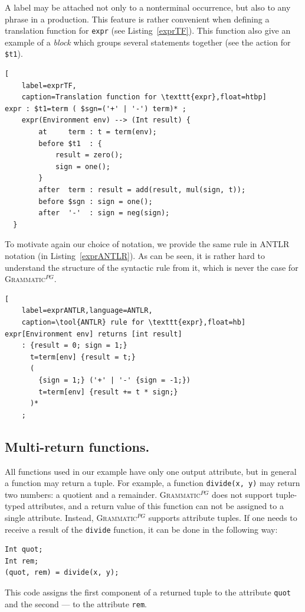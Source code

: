 \documentclass{informat} %
\newcommand{\lstref}[1]{Listing~\ref{#1}}
\newcommand{\tool}[1]{\textsc{#1}}
\newcommand{\ATF}{\textsc{Grammatic}$^{PG}$}
\begin{document}
A label may be attached not only to a nonterminal occurrence, but also to any phrase in a production. This feature is rather convenient when defining a translation function for \texttt{expr} (see \lstref{exprTF}). This function also give an example of a \emph{block} which groups several statements together (see the action for \texttt{\$t1}).

\begin{lstlisting}[
	label=exprTF,
	caption=Translation function for \texttt{expr},float=htbp]
expr : $t1=term ( $sgn=('+' | '-') term)* ;         
	expr(Environment env) --> (Int result) {  
  		at     term : t = term(env);
		before $t1  : {
			result = zero();
			sign = one();
		}
		after  term : result = add(result, mul(sign, t));
		before $sgn : sign = one();
		after  '-'  : sign = neg(sign);
  }
\end{lstlisting}

To motivate again our choice of notation, we provide the same rule in \tool{ANTLR} notation (in \lstref{exprANTLR}). As can be seen, it is rather hard to understand the structure of the syntactic rule from it, which is never the case for \ATF{}.
\begin{lstlisting}[
	label=exprANTLR,language=ANTLR,
	caption=\tool{ANTLR} rule for \texttt{expr},float=hb]
expr[Environment env] returns [int result] 
	: {result = 0; sign = 1;} 
	  t=term[env] {result = t;}
	  (
 	    {sign = 1;} ('+' | '-' {sign = -1;}) 
	    t=term[env] {result += t * sign;}
	  )* 
	;         
\end{lstlisting}

\subsection{Multi-return functions.}
All functions used in our example have only one output attribute, but in general a function may return a tuple. For example, a function \texttt{divide(x,~y)} may return two numbers: a quotient and a remainder. \ATF{} does not support tuple-typed attributes, and a return value of this function can not be assigned to a single attribute. Instead, \ATF{} supports attribute tuples. If one needs to receive a result of the \texttt{divide} function, it can be done in the following way:
\begin{lstlisting}
Int quot;
Int rem;
(quot, rem) = divide(x, y);
\end{lstlisting}
This code assigns the first component of a returned tuple to the attribute \texttt{quot} and the second --- to the attribute \texttt{rem}.
\end{document}
